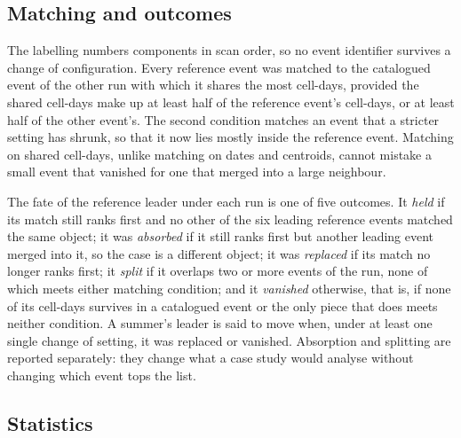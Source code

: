 \documentclass{amsdraft}
\begin{document}
\subsection{Matching and outcomes}
\label{sec:matching}

The labelling numbers components in scan order, so no event identifier
survives a change of configuration. Every reference event was matched to the
catalogued event of the other run with which it shares the most cell-days,
provided the shared cell-days make up at least half of the reference event's
cell-days, or at least half of the other event's. The second condition
matches an event that a stricter setting has shrunk, so that it now lies
mostly inside the reference event. Matching on
shared cell-days, unlike matching on dates and centroids, cannot mistake a
small event that vanished for one that merged into a large neighbour.

The fate of the reference leader under each run is one of five outcomes. It
\emph{held} if its match still ranks first and no other of the six leading
reference events matched the same object; it was \emph{absorbed} if it still
ranks first but another leading event merged into it, so the case is a
different object; it was \emph{replaced} if its match no longer ranks first;
it \emph{split} if it overlaps two or more events of the run, none of
which meets either matching condition; and it \emph{vanished} otherwise,
that is, if none of its cell-days survives in a catalogued event or the only
piece that does meets neither condition. A summer's leader is said
to move when, under at least one single change of setting, it was replaced or
vanished. Absorption and splitting are reported separately: they change what
a case study would analyse without changing which event tops the list.

\subsection{Statistics}
\label{sec:stats}
\end{document}

